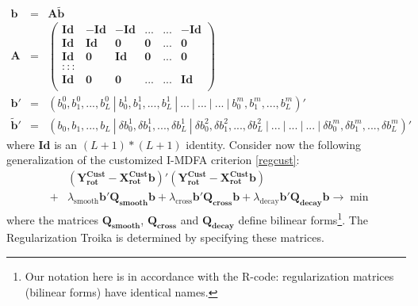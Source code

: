 \documentclass[11pt]{article}
\begin{document}
\begin{eqnarray}
\mathbf{b}&=&\mathbf{A} \mathbf{\tilde{b}}\label{btild}\\
\mathbf{A}&=&\left(\begin{array}{cccccc} \mathbf{Id}&\mathbf{-Id}&\mathbf{-Id}&...             &...&\mathbf{-Id}\\
                                                            \mathbf{Id}&\mathbf{Id}&\mathbf{0}&\mathbf{0}&...&\mathbf{0}\\
                                                            \mathbf{Id}&\mathbf{0}&\mathbf{Id}&\mathbf{0}&...&\mathbf{0}\\
:::\\
                                                            \mathbf{Id}&\mathbf{0}&\mathbf{0}&...&...&\mathbf{Id}\\
\end{array}\right)\nonumber\\
\mathbf{b}'&=&\left(b_0^0, b_1^0 ,...,b_{L}^0~|~ b_0^1, b_1^1,...,b_L^1~|~...~|~...~|~...~|~  b_0^m, b_1^m,..., b_L^m\right)'\nonumber\\
\mathbf{\tilde{b}}'&=&\left(b_0, b_1 ,...,b_L~|~ \delta b_0^1,\delta b_1^1,...,\delta b_L^1~|~ \delta b_0^2,\delta b_1^2,...,\delta b_L^2~|~...~|~...~|~...~|~ \delta b_0^m,\delta b_1^m,...,\delta b_L^m\right)'\nonumber
\end{eqnarray} 
where $\mathbf{Id}$ is an $(L+1)*(L+1)$ identity. Consider now the following generalization of the customized I-MDFA criterion \ref{regcust}:
\begin{eqnarray}\label{idfa_reg}
&&(\mathbf{Y_{\textrm{rot}}^{\textrm{Cust}}-X_{\textrm{rot}}^{\textrm{Cust}}b})'(\mathbf{Y_{\textrm{rot}}^{\textrm{Cust}}-X_{\textrm{rot}}^{\textrm{Cust}}b})\nonumber\\
&+&\lambda_{\textrm{smooth}}\mathbf{b'Q_{smooth}b}
+\lambda_{\textrm{cross}}\mathbf{b'Q_{cross}b}+\lambda_{\textrm{decay}}\mathbf{b'Q_{decay}b}\to\min
\end{eqnarray}
where the matrices $\mathbf{Q_{smooth}}$, $\mathbf{Q_{cross}}$ and $\mathbf{Q_{decay}}$ define bilinear forms\footnote{Our notation here is in accordance with the R-code:  regularization matrices (bilinear forms) have identical names.}. The Regularization Troika is determined by specifying these matrices.
\end{document}
